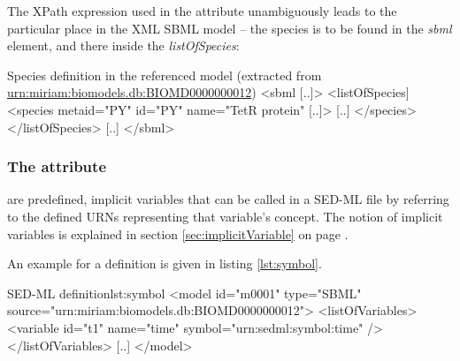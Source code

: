 The XPath expression used in the  attribute unambiguously leads to the particular place in the XML SBML model -- the species is to be found in the \emph{sbml} element, and there inside the \emph{listOfSpecies}:
%
\begin{myXmlLst}{Species definition in the referenced model (extracted from \url{urn:miriam:biomodels.db:BIOMD0000000012})}{}
<sbml [..]>
 <listOfSpecies]
  <species metaid="PY" id="PY" name="TetR protein" [..]>
   [..]
  </species>
 </listOfSpecies>
 [..]
</sbml>
\end{myXmlLst}
%

\subsubsection{The  attribute}
\label{sec:symbol}

 are predefined, implicit variables that can be called in a SED-ML file by referring to the defined URNs representing that variable's concept. The notion of implicit variables is explained in section \ref{sec:implicitVariable} on page .

An example for a  definition is given in listing \ref{lst:symbol}.
%
\begin{myXmlLst}{SED-ML  definition}{lst:symbol}
<model id="m0001" type="SBML" source="urn:miriam:biomodels.db:BIOMD0000000012">
 <listOfVariables>
  <variable id="t1" name="time" symbol="urn:sedml:symbol:time" />
 </listOfVariables>
 [..]
</model>
\end{myXmlLst}
%



